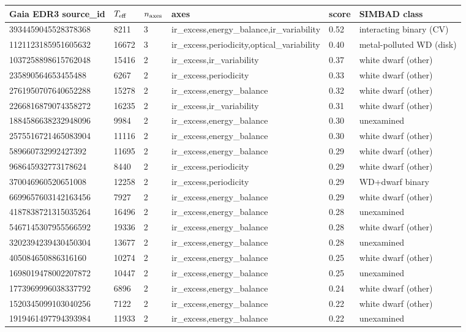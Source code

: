 \begin{tabular}{llllll}
\toprule
Gaia EDR3 source\_id & $T_{\rm eff}$ & $n_{\rm axes}$ & axes & score & SIMBAD class \\
\midrule
3934459045528378368 & 8211 & 3 & ir\_excess,energy\_balance,ir\_variability & 0.52 & interacting binary (CV) \\
1121123185951605632 & 16672 & 3 & ir\_excess,periodicity,optical\_variability & 0.40 & metal-polluted WD (disk) \\
1037258898615762048 & 15416 & 2 & ir\_excess,ir\_variability & 0.37 & white dwarf (other) \\
235890564653455488 & 6267 & 2 & ir\_excess,periodicity & 0.33 & white dwarf (other) \\
2761950707640652288 & 15278 & 2 & ir\_excess,energy\_balance & 0.32 & white dwarf (other) \\
2266816879074358272 & 16235 & 2 & ir\_excess,ir\_variability & 0.31 & white dwarf (other) \\
1884586638232948096 & 9984 & 2 & ir\_excess,energy\_balance & 0.30 & unexamined \\
2575516721465083904 & 11116 & 2 & ir\_excess,energy\_balance & 0.30 & white dwarf (other) \\
589660732992427392 & 11695 & 2 & ir\_excess,energy\_balance & 0.29 & white dwarf (other) \\
968645932773178624 & 8440 & 2 & ir\_excess,periodicity & 0.29 & white dwarf (other) \\
370046960520651008 & 12258 & 2 & ir\_excess,periodicity & 0.29 & WD+dwarf binary \\
6699657603142163456 & 7927 & 2 & ir\_excess,energy\_balance & 0.29 & white dwarf (other) \\
4187838721315035264 & 16496 & 2 & ir\_excess,energy\_balance & 0.28 & unexamined \\
5467145307955566592 & 19336 & 2 & ir\_excess,energy\_balance & 0.28 & white dwarf (other) \\
3202394239430450304 & 13677 & 2 & ir\_excess,energy\_balance & 0.28 & unexamined \\
405084650886316160 & 10274 & 2 & ir\_excess,energy\_balance & 0.25 & white dwarf (other) \\
1698019478002207872 & 10447 & 2 & ir\_excess,energy\_balance & 0.25 & unexamined \\
1773969996038337792 & 6896 & 2 & ir\_excess,energy\_balance & 0.24 & white dwarf (other) \\
1520345099103040256 & 7122 & 2 & ir\_excess,energy\_balance & 0.22 & white dwarf (other) \\
1919461497794393984 & 11933 & 2 & ir\_excess,energy\_balance & 0.22 & unexamined \\
\bottomrule
\end{tabular}
